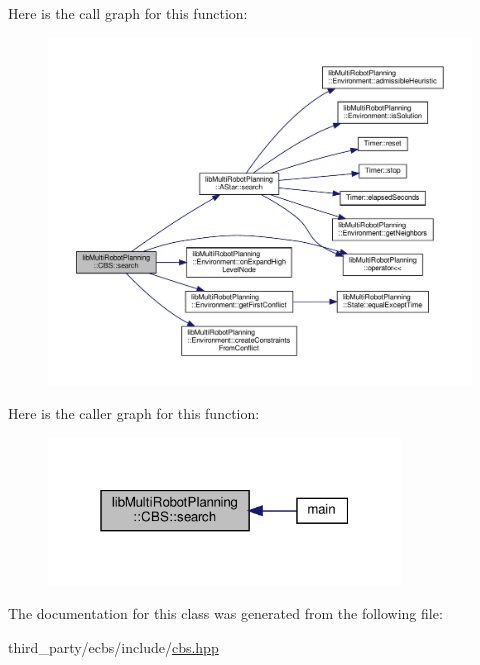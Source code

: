 Here is the call graph for this function\+:
\nopagebreak
\begin{figure}[H]
\begin{center}
\leavevmode
\includegraphics[width=350pt]{classlib_multi_robot_planning_1_1_c_b_s_a09eec524489ee5cfbf66c95a951d7bbe_cgraph}
\end{center}
\end{figure}
Here is the caller graph for this function\+:
\nopagebreak
\begin{figure}[H]
\begin{center}
\leavevmode
\includegraphics[width=265pt]{classlib_multi_robot_planning_1_1_c_b_s_a09eec524489ee5cfbf66c95a951d7bbe_icgraph}
\end{center}
\end{figure}


The documentation for this class was generated from the following file\+:\begin{DoxyCompactItemize}
\item 
third\+\_\+party/ecbs/include/\hyperlink{cbs_8hpp}{cbs.\+hpp}\end{DoxyCompactItemize}
